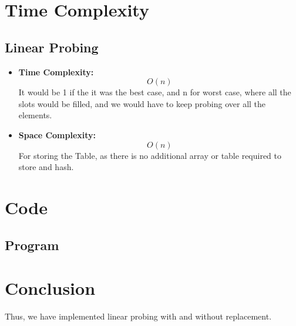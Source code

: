 \documentclass[11pt]{article}
\begin{document}
\section{Time Complexity}
\subsection{Linear Probing}
\begin{itemize}
    \item \textbf{Time Complexity:} \[O(n)\] It would be 1 if the it was the best case, and n for worst case, where all the slots would be filled, and we would have to keep probing over all the elements.
    \item \textbf{Space Complexity:} \[O(n)\] For storing the Table, as there is no additional array or table required to store and hash.
\end{itemize}

\section{Code}

\subsection{Program}




\section{Conclusion}
Thus, we have implemented linear probing with and without replacement.

\clearpage
\end{document}

